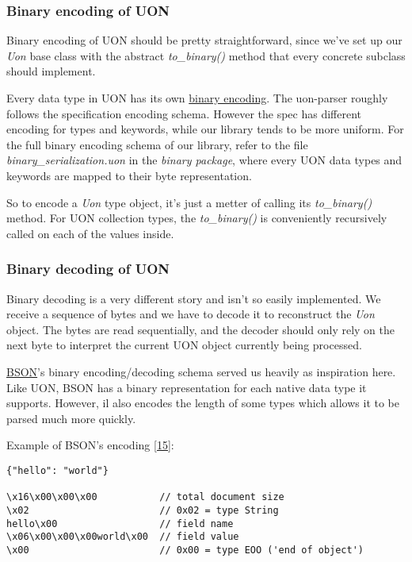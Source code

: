 \documentclass[12pt]{article}
\begin{document}
\subsubsection{Binary encoding of UON}
Binary encoding of UON should be pretty straightforward, since we've set up our \emph{Uon} base class with the abstract \emph{to\_binary()} method that every concrete subclass should implement. 

Every data type in UON has its own \href{https://github.com/uon-language/specification/blob/master/spec.md#binary-encoding}{binary encoding}. The uon-parser roughly follows the specification encoding schema. However the spec has different encoding for types and keywords, while our library tends to be more uniform. For the full binary encoding schema of our library, refer to the file \emph{binary\_serialization.uon} in the \emph{binary package}, where every UON data types and keywords are mapped to their byte representation.

So to encode a \emph{Uon} type object, it's just a metter of calling its \emph{to\_binary()} method. For UON collection types, the \emph{to\_binary()} is conveniently recursively called on each of the values inside.

\subsubsection{Binary decoding of UON}
Binary decoding is a very different story and isn't so easily implemented. We receive a sequence of bytes and we have to decode it to reconstruct the \emph{Uon} object. The bytes are read sequentially, and the decoder should only rely on the next byte to interpret the current UON object currently being processed.


\href{https://github.com/py-bson/bson}{BSON}'s binary encoding/decoding schema served us heavily as inspiration here. Like UON, BSON has a binary representation for each native data type it supports. However, il also encodes the length of some types which allows it to be parsed much more quickly. 

Example of BSON's encoding \href{https://www.mongodb.com/json-and-bson}{[15]}:
\begin{lstlisting}
{"hello": "world"} 

\x16\x00\x00\x00           // total document size
\x02                       // 0x02 = type String
hello\x00                  // field name
\x06\x00\x00\x00world\x00  // field value
\x00                       // 0x00 = type EOO ('end of object')
\end{lstlisting}
\end{document}
